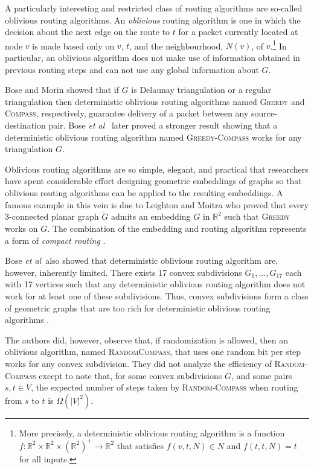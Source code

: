 \documentclass [letterpaper] {patmorin}
\newcommand{\R}{\mathbb{R}}
\newcommand{\etal}{\emph{et al}}
\begin{document}
A particularly interesting and restricted class of routing algorithms are so-called oblivious routing algorithms.  An \emph{oblivious} routing algorithm is one in which the decision about the next edge on the route to $t$ for a packet currently located at node $v$ is made based only on $v$, $t$, and the neighbourhood, $N(v)$, of $v$.\footnote{More precisely, a deterministic oblivious routing algorithm is a function $f:\R^2\times\R^2\times(\R^2)^+\rightarrow \R^2$ that satisfies $f(v,t,N) \in N$ and $f(t,t,N) = t$ for all inputs.}  In particular, an oblivious algorithm does not make use of information obtained in previous routing steps and can not use any global information about $G$.

Bose and Morin \cite{bose04} showed that if $G$ is Delaunay triangulation or a regular triangulation then deterministic oblivious routing algorithms named \textsc{Greedy} and \textsc{Compass}, respectively, guarantee delivery of a packet between any source-destination pair.  Bose \etal\ \cite{bose02} later proved a stronger result showing that a deterministic oblivious routing algorithm named \textsc{Greedy-Compass} works for any triangulation $G$.

Oblivious routing algorithms are so simple, elegant, and practical that researchers have spent considerable effort designing geometric embeddings of graphs so that oblivious routing algorithms can be applied to the resulting embeddings.  A famous example in this vein is due to Leighton and Moitra \cite{lm08} who proved that every 3-connected planar graph $\tilde G$ admits an embedding $G$ in $\R^2$ such that \textsc{Greedy} works on $G$.  The combination of the embedding and routing algorithm represents a form of \emph{compact routing} \cite{l94}.

Bose \etal\ also showed that deterministic oblivious routing algorithm are, however, inherently limited. There exists 17 convex subdivisions $G_1,\ldots,G_{17}$ each with 17 vertices such that any deterministic oblivious routing algorithm does not work for at least one of these subdivisions.  Thus, convex subdivisions form a class of geometric graphs that are too rich for deterministic oblivious routing algorithms \cite{bose02}.

The authors \cite{bose02,bose04} did, however, observe that, if randomization is allowed, then an oblivious algorithm, named \textsc{RandomCompass}, that uses one random bit per step works for any convex subdivision. They did not analyze the efficiency of \textsc{Random-Compass} except to note that, for some convex subdivisions $G$, and some pairs $s,t\in V$, the expected number of steps taken by \textsc{Random-Compass} when routing from $s$ to $t$ is $\Omega(|V|^2)$.
\end{document}
